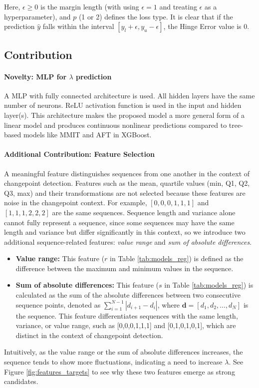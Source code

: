\documentclass[12pt]{article}
\begin{document}
\noindent Here, $\epsilon \geq 0$ is the margin length (with \citep{rigaill:13} using $\epsilon = 1$ and \citep{mmit} treating $\epsilon$ as a hyperparameter), and $p$ (1 or 2) defines the loss type.
It is clear that if the prediction $\hat{y}$ falls within the interval $[y_l + \epsilon, y_u - \epsilon]$, the Hinge Error value is 0.

\subsection{Contribution}
\paragraph{Novelty: MLP for $\lambda$ prediction}
A MLP with fully connected architecture is used.
All hidden layers have the same number of neurons.
ReLU activation function is used in the input and hidden layer(s). This architecture makes the proposed model a more general form of a linear model and produces continuous nonlinear predictions compared to tree-based models like MMIT and AFT in XGBoost.

\paragraph{Additional Contribution: Feature Selection}
A meaningful feature distinguishes sequences from one another in the context of changepoint detection.
Features such as the mean, quartile values (min, Q1, Q2, Q3, max) and their transformations are not selected because these features are noise in the changepoint context.
For example, \([0,0,0,1,1,1]\) and \([1,1,1,2,2,2]\) are the same sequences.
Sequence length and variance alone cannot fully represent a sequence, since some sequences may have the same length and variance but differ significantly in this context, so we introduce two additional sequence-related features: \textit{value range} and \textit{sum of absolute differences}.
\begin{itemize}
\item \textbf{Value range:} This feature ($r$ in Table \ref{tab:models_reg}) is defined as the difference between the maximum and minimum values in the sequence.
\item \textbf{Sum of absolute differences:} This feature ($s$ in Table \ref{tab:models_reg}) is calculated as the sum of the absolute differences between two consecutive sequence points, denoted as $\sum_{i=1}^{N-1} |d_{i+1} - d_{i}|$, where $\textbf{d} = [d_1, d_2, \dots, d_N]$ is the sequence. This feature differentiates sequences with the same length, variance, or value range, such as [0,0,0,1,1,1] and [0,1,0,1,0,1], which are distinct in the context of changepoint detection.
\end{itemize}
Intuitively, as the value range or the sum of absolute differences increases, the sequence tends to show more fluctuations, indicating a need to increase $\lambda$.
See Figure \ref{fig:features_targets} to see why these two features emerge as strong candidates.
\end{document}
